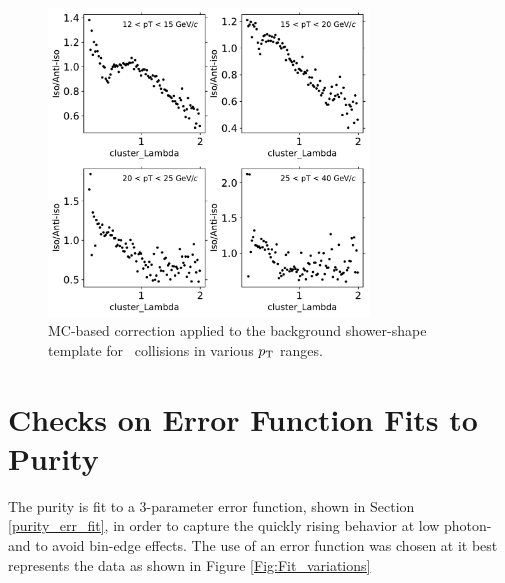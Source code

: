 \begin{figure}
	\center
	\includegraphics[width=0.76\textwidth]{Checks_Systematics/bkg-template-correction-p-Pb}
	\caption{MC-based correction applied to the background shower-shape template for \pPb~collisions in various $p_{\mathrm{T}}$ ranges.}
	\label{fig:bkgCorrection}
\end{figure}

\section{Checks on Error Function Fits to Purity}
The purity is fit to a 3-parameter error function, shown in Section \ref{purity_err_fit}, in order to capture the quickly rising behavior at low photon-\pt~ and to avoid bin-edge effects. The use of an error function was chosen at it best represents the data as shown in Figure \ref{Fig:Fit_variations}


